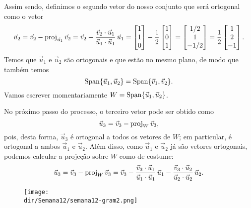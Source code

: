 \documentclass[../livro.tex]{subfiles}  %
\providecommand{\dir}{..}
\begin{document}
\begin{example}
\noindent Assim sendo, definimos o segundo vetor do nosso conjunto que será ortogonal como o vetor
\[
\vec{u}_2 = \vec{v}_2 - \operatorname{proj}_{\vec{u}_1} \vec{v}_2 = \vec{v}_2 - \frac{\vec{v}_2 \cdot \vec{u}_1}{\vec{u}_1 \cdot \vec{u}_1} \, \vec{u}_1 =
\begin{bmatrix}
1 \\ 1 \\ 0
\end{bmatrix}
- \frac{1}{2}
\begin{bmatrix}
1 \\ 0 \\ 1
\end{bmatrix} =
\begin{bmatrix}
1/2 \\ 1 \\ -1/2
\end{bmatrix} = \frac{1}{2}
\begin{bmatrix}
1 \\ 2 \\ -1
\end{bmatrix}.
\] Temos que $\vec{u}_1$ e $\vec{u}_2$ são ortogonais e que estão no mesmo plano, de modo que também temos
\[
\operatorname{Span} \{ \vec{u}_1, \vec{u}_2 \} = \operatorname{Span} \{ \vec{v}_1, \vec{v}_2 \}.
\] Vamos escrever momentariamente $W = \operatorname{Span} \{ \vec{u}_1, \vec{u}_2 \}$.

No próximo passo do processo, o terceiro vetor pode ser obtido como
\[
\vec{u}_3 = \vec{v}_3 - \operatorname{proj}_{W} \vec{v}_3,
\] pois, desta forma, $\vec{u}_3$ é ortogonal a todos os vetores de $W$; em particular, é ortogonal a ambos $\vec{u}_1$ e $\vec{u}_2$. Além disso, como $\vec{u}_1$ e $\vec{u}_2$ já são vetores ortogonais, podemos calcular a projeção sobre $W$ como de costume:
\[
\vec{u}_3 = \vec{v}_3 - \operatorname{proj}_{W} \vec{v}_3 = \vec{v}_3 - \frac{\vec{v}_3 \cdot \vec{u}_1}{\vec{u}_1 \cdot \vec{u}_1} \, \vec{u}_1 - \frac{\vec{v}_3 \cdot \vec{u}_2}{\vec{u}_2 \cdot \vec{u}_2} \, \vec{u}_2.
\]
\begin{figure}[h!]
\begin{center}
\texttt{[image: \\dir/Semana12/semana12-gram2.png]}
\end{center}
\end{figure}


\end{example}
\end{document}
